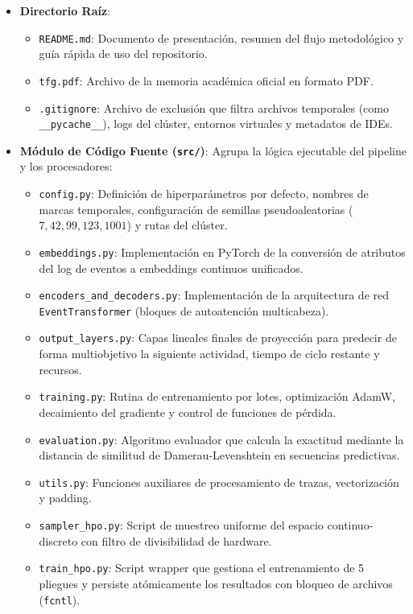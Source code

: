 \begin{itemize}
    \item \textbf{Directorio Raíz}:
    \begin{itemize}
        \item \texttt{README.md}: Documento de presentación, resumen del flujo metodológico y guía rápida de uso del repositorio.
        \item \texttt{tfg.pdf}: Archivo de la memoria académica oficial en formato PDF.
        \item \texttt{.gitignore}: Archivo de exclusión que filtra archivos temporales (como \texttt{\_\_pycache\_\_}), logs del clúster, entornos virtuales y metadatos de IDEs.
    \end{itemize}

    \item \textbf{Módulo de Código Fuente (\texttt{src/})}: Agrupa la lógica ejecutable del pipeline y los procesadores:
    \begin{itemize}
        \item \texttt{config.py}: Definición de hiperparámetros por defecto, nombres de marcas temporales, configuración de semillas pseudoaleatorias ($7, 42, 99, 123, 1001$) y rutas del clúster.
        \item \texttt{embeddings.py}: Implementación en PyTorch de la conversión de atributos del log de eventos a embeddings continuos unificados.
        \item \texttt{encoders\_and\_decoders.py}: Implementación de la arquitectura de red \texttt{EventTransformer} (bloques de autoatención multicabeza).
        \item \texttt{output\_layers.py}: Capas lineales finales de proyección para predecir de forma multiobjetivo la siguiente actividad, tiempo de ciclo restante y recursos.
        \item \texttt{training.py}: Rutina de entrenamiento por lotes, optimización AdamW, decaimiento del gradiente y control de funciones de pérdida.
        \item \texttt{evaluation.py}: Algoritmo evaluador que calcula la exactitud mediante la distancia de similitud de Damerau-Levenshtein en secuencias predictivas.
        \item \texttt{utils.py}: Funciones auxiliares de procesamiento de trazas, vectorización y padding.
        \item \texttt{sampler\_hpo.py}: Script de muestreo uniforme del espacio continuo-discreto con filtro de divisibilidad de hardware.
        \item \texttt{train\_hpo.py}: Script wrapper que gestiona el entrenamiento de 5 pliegues y persiste atómicamente los resultados con bloqueo de archivos (\texttt{fcntl}).

\end{itemize}
\end{itemize}

